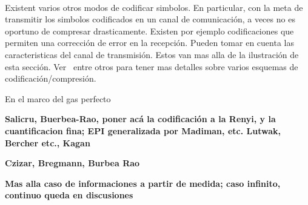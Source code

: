 \

Existent varios otros modos de codificar simbolos. En particular, con la meta de
transmitir los simbolos codificados en un canal de comunicaci\'on, a veces no es
oportuno  de compresar  drasticamente.  Existen  por ejemplo  codificaciones que
permiten una correcci\'on de error en la recepci\'on. Pueden tomar en cuenta las
caracteristicas  del  canal  de  transmisi\'on.    Estos  van  mas  alla  de  la
ilustraci\'on  de  esta  secci\'on.   Ver~\cite{Ber74, Gal78,  Say03,  CovTho06,
  Rio07}  entre  otros  para  tener   mas  detalles  sobre  varios  esquemas  de
codificaci\'on/compresi\'on.




\label{sec:SZ:GasPerfecto}

En el marco del gas perfecto




\label{sec:SZ:Generalizadas}


\label{sec:SZ:Salicru}

{\bf  Salicru, Buerbea-Rao,  poner  ac\'a la  codificaci\'on  a la  Renyi, y  la
  cuantificacion fina; EPI generalizada  por Madiman, etc. Lutwak, Bercher etc.,
  Kagan}


\label{sec:SZ:Czizar}

{\bf Czizar, Bregmann, Burbea Rao}



\label{sec:SZ:Cuanticas}

{\bf Mas alla caso de informaciones a partir de medida; caso infinito, continuo queda en discusiones}






